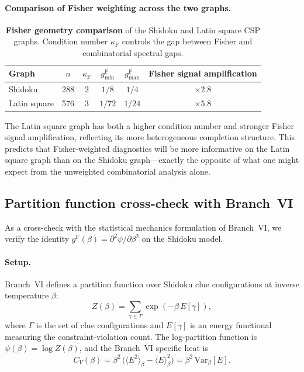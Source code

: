 \documentclass[11pt]{article}
\newcommand{\Var}{\mathrm{Var}}
\newcommand{\gF}{g^{\mathrm{F}}}
\theoremstyle{remark}
\begin{document}
\paragraph{Comparison of Fisher weighting across the two graphs.}
\begin{table}[htbp]
\centering
\caption{\textbf{Fisher geometry comparison} of the Shidoku and Latin square
CSP graphs.  Condition number $\kappa_{\mathrm{F}}$ controls the gap between
Fisher and combinatorial spectral gaps.}
\label{tab:fisher-comparison}
\begin{tabular}{lccccc}
\toprule
Graph & $n$ & $\kappa_{\mathrm{F}}$ & $\gF_{\min}$ & $\gF_{\max}$ &
Fisher signal amplification \\
\midrule
Shidoku & 288 & 2 & $1/8$ & $1/4$ & $\times 2.8$ \\
Latin square & 576 & 3 & $1/72$ & $1/24$ & $\times 5.8$ \\
\bottomrule
\end{tabular}
\end{table}

The Latin square graph has both a higher condition number and stronger Fisher
signal amplification, reflecting its more heterogeneous completion structure.
This predicts that Fisher-weighted diagnostics will be more informative on the
Latin square graph than on the Shidoku graph---exactly the opposite of what
one might expect from the unweighted combinatorial analysis alone.

\subsection{Partition function cross-check with Branch~VI}

As a cross-check with the statistical mechanics formulation of Branch~VI, we
verify the identity $\gF(\beta) = \partial^2 \psi / \partial\beta^2$ on the
Shidoku model.

\paragraph{Setup.}  Branch~VI defines a partition function over Shidoku clue
configurations at inverse temperature $\beta$:
\[
Z(\beta) = \sum_{\gamma \in \Gamma} \exp(-\beta\, E[\gamma]),
\]
where $\Gamma$ is the set of clue configurations and $E[\gamma]$ is an energy
functional measuring the constraint-violation count.  The log-partition function
is $\psi(\beta) = \log Z(\beta)$, and the Branch~VI specific heat is
\[
C_V(\beta) = \beta^2\,\bigl(\langle E^2 \rangle_\beta -
\langle E \rangle_\beta^2\bigr)
= \beta^2\, \Var_\beta[E].
\]
\end{document}
